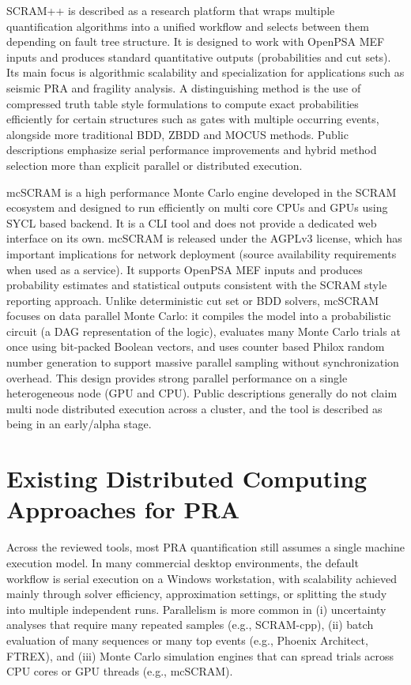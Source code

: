 SCRAM++ \cite{scram++_2025} is described as a research platform that wraps multiple quantification algorithms into a unified workflow and selects between them depending on fault tree structure. It is designed to work with OpenPSA MEF inputs and produces standard quantitative outputs (probabilities and cut sets). Its main focus is algorithmic scalability and specialization for applications such as seismic PRA and fragility analysis. A distinguishing method is the use of compressed truth table style formulations to compute exact probabilities efficiently for certain structures such as gates with multiple occurring events, alongside more traditional BDD, ZBDD and MOCUS methods. Public descriptions emphasize serial performance improvements and hybrid method selection more than explicit parallel or distributed execution.

mcSCRAM \cite{arjun_mcscram} is a high performance Monte Carlo engine developed in the SCRAM ecosystem and designed to run efficiently on multi core CPUs and GPUs using SYCL based backend. It is a CLI tool and does not provide a dedicated web interface on its own. mcSCRAM is released under the AGPLv3 license, which has important implications for network deployment (source availability requirements when used as a service). It supports OpenPSA MEF inputs and produces probability estimates and statistical outputs consistent with the SCRAM style reporting approach. Unlike deterministic cut set or BDD solvers, mcSCRAM focuses on data parallel Monte Carlo: it compiles the model into a probabilistic circuit (a DAG representation of the logic), evaluates many Monte Carlo trials at once using bit-packed Boolean vectors, and uses counter based Philox random number generation to support massive parallel sampling without synchronization overhead. This design provides strong parallel performance on a single heterogeneous node (GPU and CPU). Public descriptions generally do not claim multi node distributed execution across a cluster, and the tool is described as being in an early/alpha stage.

\section{Existing Distributed Computing Approaches for PRA}
\label{sec:lr-parallel-distributed}

Across the reviewed tools, most PRA quantification still assumes a single machine execution model. In many commercial desktop environments, the default workflow is serial execution on a Windows workstation, with scalability achieved mainly through solver efficiency, approximation settings, or splitting the study into multiple independent runs. Parallelism is more common in (i) uncertainty analyses that require many repeated samples (e.g., SCRAM-cpp), (ii) batch evaluation of many sequences or many top events (e.g., Phoenix Architect, FTREX), and (iii) Monte Carlo simulation engines that can spread trials across CPU cores or GPU threads (e.g., mcSCRAM).

